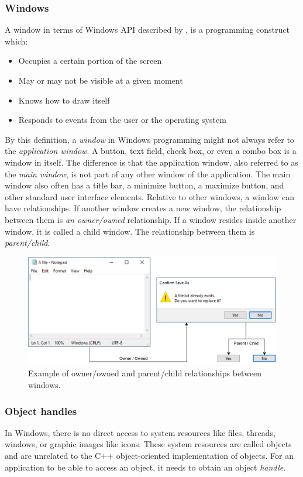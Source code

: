 \subsubsection{Windows}
\label{ch2Windows}
A window in terms of Windows API described by \cite{WinWindow}, is a programming construct which:
\begin{itemize}
    \item Occupies a certain portion of the screen
    \item May or may not be visible at a given moment
    \item Knows how to draw itself
    \item Responds to events from the user or the operating system
\end{itemize}
By this definition, a \textit{window} in Windows programming might not always refer to the \textit{application window}. A button, text field, check box, or even a combo box is a window in itself. The difference is that the application window, also referred to as the \textit{main window}, is not part of any other window of the application. The main window also often has a title bar, a minimize button, a maximize button, and other standard user interface elements. Relative to other windows, a window can have relationships. If another window creates a new window, the relationship between them is \textit{an owner/owned} relationship. If a window resides inside another window, it is called a child window. The relationship between them is \textit{parent/child}.\cite{WinWindow}
\begin{figure}[htbp]
	\centering
	\includegraphics[width=\columnwidth]{obrazky-figures/windows_rels_wh.pdf}
	\caption{Example of owner/owned and parent/child relationships between windows.}
	\label{windowsExample}
\end{figure}

\subsubsection{Object handles}
\label{ch2handle}
In Windows, there is no direct access to system resources like files, threads, windows, or graphic images like icons. These system resources are called objects and are unrelated to the C++ object-oriented implementation of objects. For an application to be able to access an object, it needs to obtain an object \textit{handle}.


